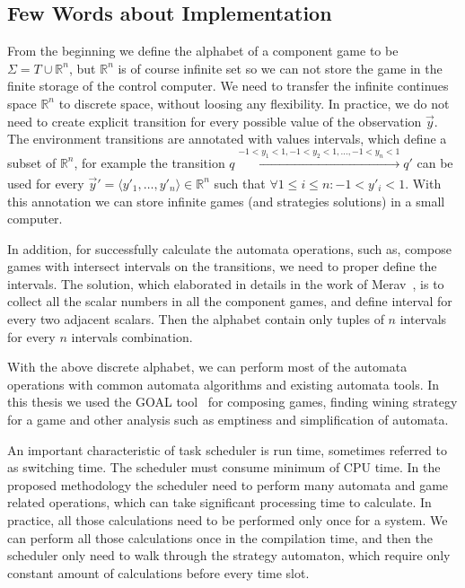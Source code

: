 \documentclass[ twoside, 12pt ]{article}
\newcommand\R{{\mathbb R}}
\begin{document}
\subsection{Few Words about Implementation}

From the beginning we define the alphabet of a component game to be $\Sigma = T \cup \R^n$, but $\R^n$ is of course infinite set so we can not store the game in the finite storage of the control computer.
We need to transfer the infinite continues space $\R^n$ to discrete space, without loosing any flexibility.
In practice, we do not need to create explicit transition for every possible value of the observation $\vec{y}$.
The environment transitions are annotated with values intervals, which define a subset of $\R^n$, for example the transition $q \xrightarrow[]{-1<y_1<1, -1<y_2<1, \dots , -1<y_n<1 } q'$ can be used for every $\vec{y}' = \langle y'_1, \dots , y'_n \rangle \in \R^n$ such that $\forall 1 \le i \le n : -1 < y'_i < 1$.
With this annotation we can store infinite games (and strategies solutions) in a small computer.

In addition, for successfully calculate the automata operations, such as, compose games with intersect intervals on the transitions, we need to proper define the intervals.
The solution, which elaborated in details in the work of Merav~\cite{Merav}, is to collect all the scalar numbers in all the component games, and define interval for every two adjacent scalars. Then the alphabet contain only tuples of $n$ intervals for every $n$ intervals combination. 


With the above discrete alphabet, we can perform most of the automata operations with common automata algorithms and existing automata tools. 
In this thesis we used the GOAL tool~\cite{goal} for composing games, finding wining strategy for a game and other analysis such as emptiness and simplification of automata.

An important characteristic of task scheduler is run time, sometimes referred to as switching time.
The scheduler must consume minimum of CPU time. In the proposed methodology the scheduler need to perform many automata and game related operations, which can take significant processing time to calculate.
In practice, all those calculations need to be performed only once for a system. 
We can perform all those calculations once in the compilation time, and then the scheduler only need to walk through the strategy automaton, which require only constant amount of calculations before every time slot.
\end{document}
